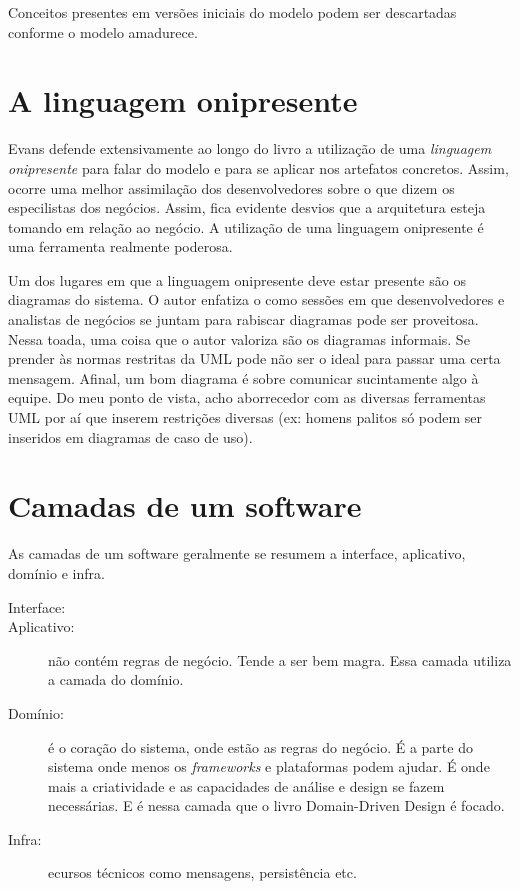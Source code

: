 \documentclass[a4paper, 12pt]{article}
\begin{document}
Conceitos presentes em versões iniciais do modelo podem ser descartadas conforme o modelo amadurece.

\section{A linguagem onipresente}

Evans defende extensivamente ao longo do livro a utilização de uma \emph{linguagem onipresente} para falar do modelo e para se aplicar nos artefatos concretos. Assim, ocorre uma melhor assimilação dos desenvolvedores sobre o que dizem os especilistas dos negócios. Assim, fica evidente desvios que a arquitetura esteja tomando em relação ao negócio. A utilização de uma linguagem onipresente é uma ferramenta realmente poderosa.

Um dos lugares em que a linguagem onipresente deve estar presente são os diagramas do sistema. O autor enfatiza o como sessões em que desenvolvedores e analistas de negócios se juntam para rabiscar diagramas pode ser proveitosa. Nessa toada, uma coisa que o autor valoriza são os diagramas informais. Se prender às normas restritas da UML pode não ser o ideal para passar uma certa mensagem. Afinal, um bom diagrama é sobre comunicar sucintamente algo à equipe. Do meu ponto de vista, acho aborrecedor com as diversas ferramentas UML por aí que inserem restrições diversas (ex: homens palitos só podem ser inseridos em diagramas de caso de uso).

\section{Camadas de um software}

As camadas de um software geralmente se resumem a interface, aplicativo, domínio e infra.

\begin{description}
\item [Interface:]
\item [Aplicativo:] não contém regras de negócio. Tende a ser bem magra. Essa camada utiliza a camada do domínio.
\item [Domínio:] é o coração do sistema, onde estão as regras do negócio. É a parte do sistema onde menos os \emph{frameworks} e plataformas podem ajudar. É onde mais a criatividade e as capacidades de análise e design se fazem necessárias. E é nessa camada que o livro Domain-Driven Design é focado.
\item [Infra:] ecursos técnicos como mensagens, persistência etc.
\end{description}
\end{document}
